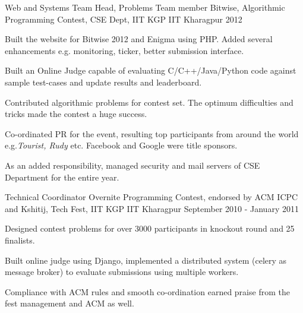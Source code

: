 

\begin{cventries}

  \cventry
    {Web and Systems Team Head, Problems Team member} %
    {Bitwise, Algorithmic Programming Contest, CSE Dept, IIT KGP} %
    {IIT Kharagpur} %
    {2012} %
    {
      \begin{cvitems} %
        \item {Built the website for Bitwise 2012 and Enigma using PHP. Added several enhancements e.g. monitoring, ticker, better submission interface.}
        \item {Built an Online Judge capable of evaluating C/C++/Java/Python code against sample test-cases and update results and leaderboard.}
        \item {Contributed algorithmic problems for contest set. The optimum difficulties and tricks made the contest a huge success.}
        \item {Co-ordinated PR for the event, resulting top participants from around the world e.g.\textit{Tourist, Rudy} etc. Facebook and Google were title sponsors.}
        \item {As an added responsibility, managed security and mail servers of CSE Department for the entire year.}
      \end{cvitems}
    }

  \cventry
    {Technical Coordinator} %
    {Overnite Programming Contest, endorsed by ACM ICPC and Kshitij, Tech Fest, IIT KGP} %
    {IIT Kharagpur} %
    {September 2010 - January 2011} %
    {
      \begin{cvitems} %
        \item {Designed contest problems for over 3000 participants in knockout round and 25 finalists.}
        \item {Built online judge using Django, implemented a distributed system (celery as message broker) to evaluate submissions using multiple workers.}
        \item {Compliance with ACM rules and smooth co-ordination earned praise from the fest management and ACM as well.}
      \end{cvitems}
    }    
    

\end{cventries}
